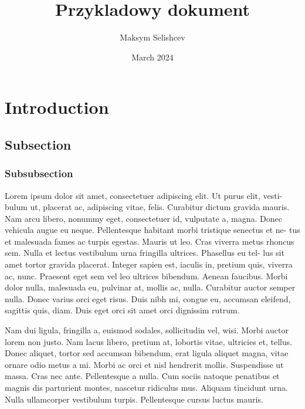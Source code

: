 \documentclass{article}
\title{Przykladowy dokument}
\author{Maksym Selishcev}
\date{March 2024}
\begin{document}
  
\maketitle

\vspace{7cm}



\tableofcontents

\section{Introduction}
    \subsection{Subsection}
        \subsubsection{Subsubsection}

        
        
    
    
Lorem ipsum dolor sit amet, consectetuer adipiscing elit. Ut purus elit, vesti- bulum ut, placerat ac, adipiscing vitae, felis. Curabitur dictum gravida mauris. Nam arcu libero, nonummy eget, consectetuer id, vulputate a, magna. Donec vehicula augue eu neque. Pellentesque habitant morbi tristique senectus et ne- tus et malesuada fames ac turpis egestas. Mauris ut leo. Cras viverra metus rhoncus sem. Nulla et lectus vestibulum urna fringilla ultrices. Phasellus eu tel- lus sit amet tortor gravida placerat. Integer sapien est, iaculis in, pretium quis, viverra ac, nunc. Praesent eget sem vel leo ultrices bibendum. Aenean faucibus. Morbi dolor nulla, malesuada eu, pulvinar at, mollis ac, nulla. Curabitur auctor semper nulla. Donec varius orci eget risus. Duis nibh mi, congue eu, accumsan eleifend, sagittis quis, diam. Duis eget orci sit amet orci dignissim rutrum.

Nam dui ligula, fringilla a, euismod sodales, sollicitudin vel, wisi. Morbi auctor lorem non justo. Nam lacus libero, pretium at, lobortis vitae, ultricies et, tellus. Donec aliquet, tortor sed accumsan bibendum, erat ligula aliquet magna, vitae ornare odio metus a mi. Morbi ac orci et nisl hendrerit mollis. Suspendisse ut massa. Cras nec ante. Pellentesque a nulla. Cum sociis natoque penatibus et magnis dis parturient montes, nascetur ridiculus mus. Aliquam tincidunt urna. Nulla ullamcorper vestibulum turpis. Pellentesque cursus luctus mauris.
\end{document}
